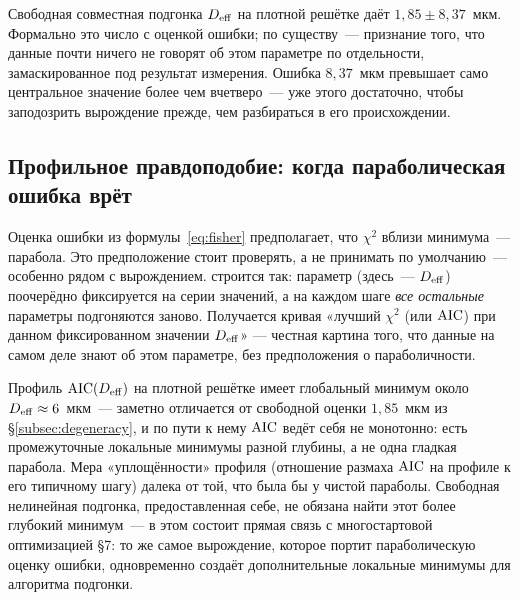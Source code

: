 \begin{warning}
Свободная совместная подгонка $D_{\mathrm{eff}}$ на плотной решётке даёт $1{,}85\pm8{,}37$~мкм. Формально
это число с оценкой ошибки; по существу~--- признание того, что данные почти ничего не говорят об
этом параметре по отдельности, замаскированное под результат измерения. Ошибка $8{,}37$~мкм
превышает само центральное значение более чем вчетверо~--- уже этого достаточно, чтобы
заподозрить вырождение прежде, чем разбираться в его происхождении.
\end{warning}

\subsection{Профильное правдоподобие: когда параболическая ошибка врёт}
\label{subsec:profile}

Оценка ошибки из формулы~\eqref{eq:fisher} предполагает, что $\chi^2$ вблизи минимума~---
парабола. Это предположение стоит проверять, а не принимать по умолчанию~--- особенно рядом с
вырождением.  строится так: параметр (здесь~--- $D_{\mathrm{eff}}$)
поочерёдно фиксируется на серии значений, а на каждом шаге \emph{все остальные} параметры
подгоняются заново. Получается кривая «лучший $\chi^2$ (или $\operatorname{AIC}$) при данном фиксированном
значении $D_{\mathrm{eff}}$» — честная картина того, что данные на самом деле знают об этом параметре, без
предположения о параболичности.

\begin{example}
Профиль $\operatorname{AIC}(D_{\mathrm{eff}})$ на плотной решётке имеет глобальный минимум около $D_{\mathrm{eff}}\approx6$~мкм~---
заметно отличается от свободной оценки $1{,}85$~мкм из §\ref{subsec:degeneracy}, и по пути к нему
$\operatorname{AIC}$ ведёт себя не монотонно: есть промежуточные локальные минимумы разной глубины, а не одна
гладкая парабола. Мера «уплощённости» профиля (отношение размаха $\operatorname{AIC}$ на профиле к его
типичному шагу) далека от той, что была бы у чистой параболы. Свободная нелинейная подгонка,
предоставленная себе, не обязана найти этот более глубокий минимум~--- в этом состоит прямая связь
с многостартовой оптимизацией §7: то же самое вырождение, которое портит параболическую оценку
ошибки, одновременно создаёт дополнительные локальные минимумы для алгоритма подгонки.
\end{example}

